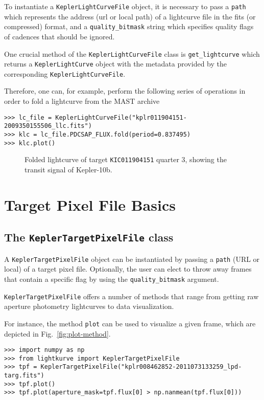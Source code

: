 \documentclass[twocolumn]{aastex62}
\begin{document}
        To instantiate a \texttt{KeplerLightCurveFile} object, it is necessary
        to pass a \texttt{path} which represents the address (url or local path)
        of a lightcurve file in the fits (or compressed) format, and a
        \texttt{quality\_bitmask} string which specifies quality
        flags of cadences that should be ignored.

        One crucial method of the \texttt{KeplerLightCurveFile} class is
        \texttt{get\_lightcurve} which returns a \texttt{KeplerLightCurve} object
        with the metadata provided by the corresponding \texttt{KeplerLightCurveFile}.

        Therefore, one can, for example, perform the following series of operations
        in order to fold a lightcurve from the MAST archive
\begin{verbatim}
>>> lc_file = KeplerLightCurveFile("kplr011904151-2009350155506_llc.fits")
>>> klc = lc_file.PDCSAP_FLUX.fold(period=0.837495)
>>> klc.plot()
\end{verbatim}

\begin{figure}
\caption{Folded lightcurve of target \texttt{KIC011904151} quarter 3, showing the
            transit signal of Kepler-10b.
\label{fig:fold-method}}
\end{figure}

\section{Target Pixel File Basics}
    \subsection{The \texttt{KeplerTargetPixelFile} class}
        A \texttt{KeplerTargetPixelFile} object can be instantiated
        by passing a \texttt{path} (URL or local) of a target pixel file.
        Optionally, the user can elect to throw away frames that contain
        a specific flag by using the \texttt{quality\_bitmask} argument.

        \texttt{KeplerTargetPixelFile} offers a number of methods
        that range from getting raw aperture photometry lightcurves to
        data visualization.

        For instance, the method \texttt{plot} can be used to visualize a
        given frame, which are depicted in Fig.~\ref{fig:plot-method}.
\begin{verbatim}
>>> import numpy as np
>>> from lightkurve import KeplerTargetPixelFile
>>> tpf = KeplerTargetPixelFile("kplr008462852-2011073133259_lpd-targ.fits")
>>> tpf.plot()
>>> tpf.plot(aperture_mask=tpf.flux[0] > np.nanmean(tpf.flux[0]))
\end{verbatim}
\end{document}
